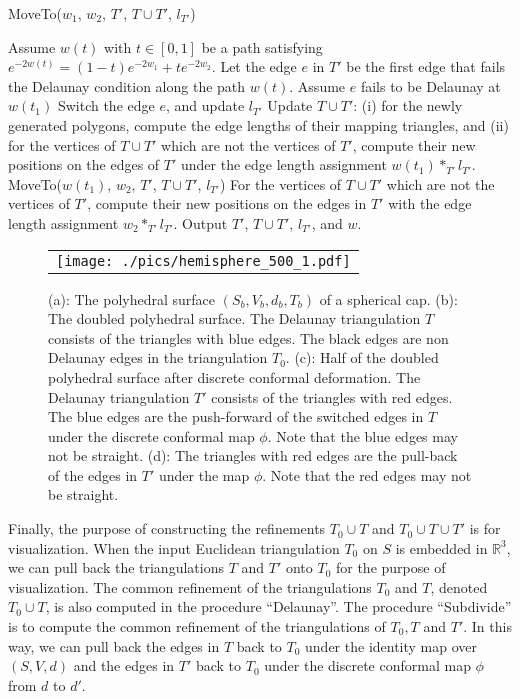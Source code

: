 \documentclass[11pt]{article}
\begin{document}
\begin{algorithm*}[!h]
\caption{MoveTo($w_1$, $w_2$, $T'$, $T\cup T'$, $l_{T'}$)}
\label{alg:moveto}
\begin{algorithmic}[1]
\STATE Assume $w(t)$ with $t \in [0, 1]$ be a path satisfying $e^{-2w(t)} = (1-t)e^{-2w_1}+ te^{-2w_2}$. 
\STATE Let the edge $e$ in $T'$ be the first edge that fails the Delaunay condition along the path $w(t)$. 
\STATE Assume $e$ fails to be Delaunay at $w(t_1)$
\STATE Switch the edge $e$, and update $l_{T'}$
\STATE Update $T\cup T'$: (i) for the newly generated polygons, compute the edge lengths of their mapping triangles, 
and (ii) for the vertices of $T\cup T'$ which are not the vertices of $T'$, 
compute their new positions on the edges of $T'$ under the edge length assignment $w(t_1)*_{T'} l_{T'}$. 
\STATE MoveTo($w(t_1)$, $w_2$, $T'$, $T\cup T'$, $l_{T'}$)
\ELSE
\STATE For the vertices of $T\cup T'$ which are not the vertices of $T'$, compute their new positions 
on the edges in $T'$ with the edge length assignment $w_2*_{T'} l_{T'}$.
\ENDIF
\STATE Output $T'$, $T\cup T'$, $l_{T'}$, and $w$.
\end{algorithmic}
\end{algorithm*}


\begin{figure}[!t]
\begin{center}
\begin{tabular}{c}
\texttt{[image: ./pics/hemisphere\_500\_1.pdf]}
\end{tabular}
\end{center}
\vspace{0.1in}
\caption{(a): The polyhedral surface $(S_b, V_b, d_b, T_b)$ of a spherical cap.  
(b): The doubled polyhedral surface. The Delaunay 
triangulation $T$ consists of the triangles with blue edges. 
The black edges are non Delaunay edges in the triangulation $T_0$. 
(c): Half of the doubled polyhedral surface after discrete conformal deformation. 
The Delaunay triangulation $T'$ consists of the triangles with red edges. 
The blue edges are the push-forward of the switched edges in $T$
under the discrete conformal map $\phi$. 
Note that the blue edges may not be straight. 
(d): The triangles with red edges are the pull-back of the edges in $T'$ 
under the map $\phi$. Note that the red edges may not be straight. 
\label{fig:algorithm_illustration}}
\end{figure}


Finally, the purpose of constructing the refinements $T_0\cup T$ and $T_0\cup T \cup T'$ 
is for visualization. When the input Euclidean triangulation $T_0$ on $S$ is embedded 
in $\mathbb{R}^3$, we can pull back the triangulations $T$ and $T'$ onto $T_0$ for the purpose 
of visualization.  The common refinement of the triangulations $T_0$ and $T$, denoted $T_0\cup T$,
is also computed in the procedure ``Delaunay''. The procedure ``Subdivide'' is to
compute the common refinement of the triangulations of $T_0, T$ and $T'$. In this way, we can
pull back the edges in $T$ back to $T_0$ under the identity map over $(S, V, d)$ and the edges in
$T'$ back to $T_0$ under the discrete conformal map $\phi$ from $d$ to $d'$. 
\end{document}
